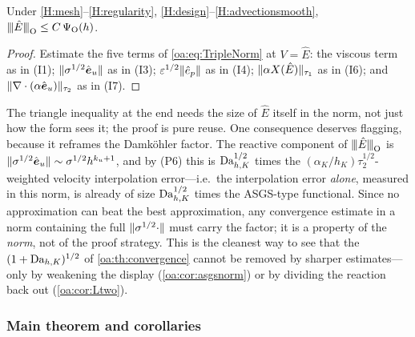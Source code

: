 \begin{lemma}
\label{oa:lem:interpsize}
Under \cref{H:mesh}--\cref{H:regularity}, \cref{H:design}--\cref{H:advectionsmooth},
${\lvert\kern-0.25ex\lvert\kern-0.25ex\lvert \hat E \rvert\kern-0.25ex\rvert\kern-0.25ex\rvert}_{\mathrm{O}} \le C\,\Psi_{\mathrm O}(h)$.
\end{lemma}

\begin{proof}
Estimate the five terms of \cref{oa:eq:TripleNorm} at $V = \hat E$: the viscous term as
in (I1); $\lVert \sigma^{1/2}\hat{\boldsymbol e}_u \rVert$ as in (I3);
$\varepsilon^{1/2}\lVert \hat e_p \rVert$ as in (I4);
$\lVert \alpha X(\hat E) \rVert_{\tau_1}$ as in (I6); and
$\lVert \nabla\cdot(\alpha\hat{\boldsymbol e}_u) \rVert_{\tau_2}$ as in (I7).
\end{proof}

\begin{pedagogy}
The triangle inequality at the end needs the size of $\hat E$ itself in the
norm, not just how the form sees it; the proof is pure reuse. One consequence
deserves flagging, because it reframes the Damk\"ohler factor. The reactive
component of ${\lvert\kern-0.25ex\lvert\kern-0.25ex\lvert \hat E \rvert\kern-0.25ex\rvert\kern-0.25ex\rvert}_{\mathrm O}$ is
$\lVert \sigma^{1/2}\hat{\boldsymbol e}_u \rVert \sim \sigma^{1/2}h^{k_u+1}$, and by
(P6) this is $\mathrm{Da}_{h,K}^{1/2}$ times the $(\alpha_K/h_K)\tau_2^{1/2}$-weighted
velocity interpolation error---i.e.\ the interpolation error \emph{alone},
measured in this norm, is already of size $\mathrm{Da}_{h,K}^{1/2}$ times the ASGS-type
functional. Since no approximation can beat the best approximation, any
convergence estimate in a norm containing the full $\lVert \sigma^{1/2}\cdot \rVert$
must carry the factor; it is a property of the \emph{norm}, not of the proof
strategy. This is the cleanest way to see that the $(1+\mathrm{Da}_{h,K})^{1/2}$ of
\cref{oa:th:convergence} cannot be removed by sharper estimates---only by
weakening the display (\cref{oa:cor:asgsnorm}) or by dividing the reaction back
out (\cref{oa:cor:Ltwo}).
\end{pedagogy}

\subsubsection{Main theorem and corollaries}

